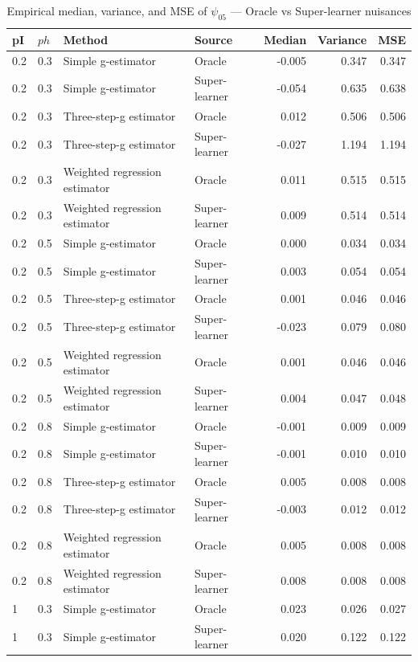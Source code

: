 \documentclass{article}
\begin{document}
\begin{table}[ht]
\centering
\caption{Empirical median, variance, and MSE of $\psi_{05}$ --- Oracle vs Super-learner nuisances}
\begin{tabular}{ll l l r r r}
\toprule
pI & $ph$ & Method & Source & Median & Variance & MSE \\
\midrule
0.2 & 0.3 & Simple g-estimator & Oracle & -0.005 & 0.347 & 0.347 \\
0.2 & 0.3 & Simple g-estimator & Super-learner & -0.054 & 0.635 & 0.638 \\
0.2 & 0.3 & Three-step-g estimator & Oracle & 0.012 & 0.506 & 0.506 \\
0.2 & 0.3 & Three-step-g estimator & Super-learner & -0.027 & 1.194 & 1.194 \\
0.2 & 0.3 & Weighted regression estimator & Oracle & 0.011 & 0.515 & 0.515 \\
0.2 & 0.3 & Weighted regression estimator & Super-learner & 0.009 & 0.514 & 0.514 \\
0.2 & 0.5 & Simple g-estimator & Oracle & 0.000 & 0.034 & 0.034 \\
0.2 & 0.5 & Simple g-estimator & Super-learner & 0.003 & 0.054 & 0.054 \\
0.2 & 0.5 & Three-step-g estimator & Oracle & 0.001 & 0.046 & 0.046 \\
0.2 & 0.5 & Three-step-g estimator & Super-learner & -0.023 & 0.079 & 0.080 \\
0.2 & 0.5 & Weighted regression estimator & Oracle & 0.001 & 0.046 & 0.046 \\
0.2 & 0.5 & Weighted regression estimator & Super-learner & 0.004 & 0.047 & 0.048 \\
0.2 & 0.8 & Simple g-estimator & Oracle & -0.001 & 0.009 & 0.009 \\
0.2 & 0.8 & Simple g-estimator & Super-learner & -0.001 & 0.010 & 0.010 \\
0.2 & 0.8 & Three-step-g estimator & Oracle & 0.005 & 0.008 & 0.008 \\
0.2 & 0.8 & Three-step-g estimator & Super-learner & -0.003 & 0.012 & 0.012 \\
0.2 & 0.8 & Weighted regression estimator & Oracle & 0.005 & 0.008 & 0.008 \\
0.2 & 0.8 & Weighted regression estimator & Super-learner & 0.008 & 0.008 & 0.008 \\
1 & 0.3 & Simple g-estimator & Oracle & 0.023 & 0.026 & 0.027 \\
1 & 0.3 & Simple g-estimator & Super-learner & 0.020 & 0.122 & 0.122 \\

\end{tabular}
\end{table}
\end{document}
